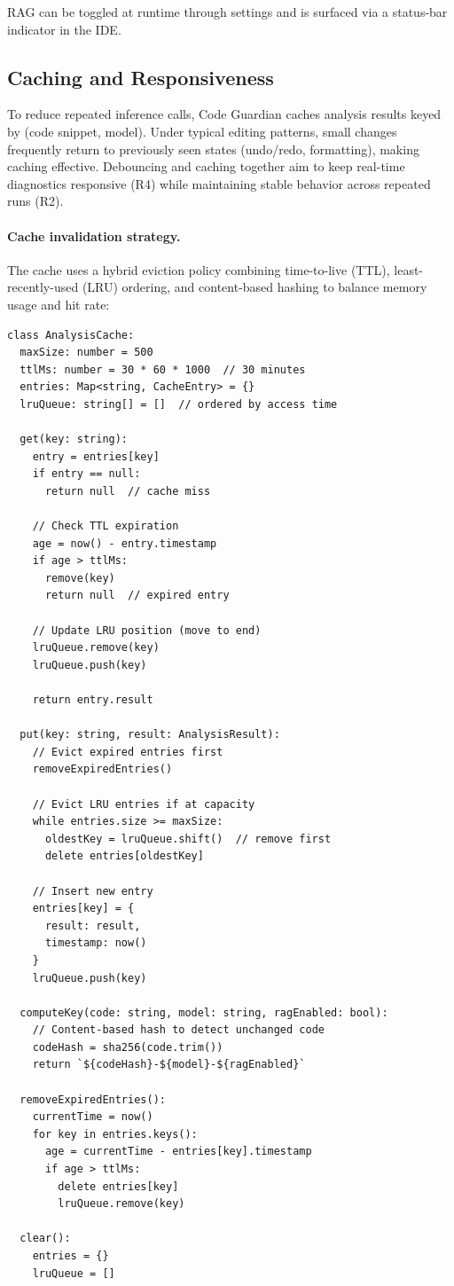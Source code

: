 RAG can be toggled at runtime through settings and is surfaced via a status-bar indicator in the IDE.

\subsection{Caching and Responsiveness}
\label{subsec:impl-caching}

To reduce repeated inference calls, Code Guardian caches analysis results keyed by (code snippet, model). Under typical editing patterns, small changes frequently return to previously seen states (undo/redo, formatting), making caching effective. Debouncing and caching together aim to keep real-time diagnostics responsive (R4) while maintaining stable behavior across repeated runs (R2).

\paragraph{Cache invalidation strategy.}
The cache uses a hybrid eviction policy combining time-to-live (TTL), least-recently-used (LRU) ordering, and content-based hashing to balance memory usage and hit rate:

\begin{lstlisting}[caption={Cache invalidation and eviction strategy}, label={lst:impl-cache-invalidation}]
class AnalysisCache:
  maxSize: number = 500
  ttlMs: number = 30 * 60 * 1000  // 30 minutes
  entries: Map<string, CacheEntry> = {}
  lruQueue: string[] = []  // ordered by access time

  get(key: string):
    entry = entries[key]
    if entry == null:
      return null  // cache miss

    // Check TTL expiration
    age = now() - entry.timestamp
    if age > ttlMs:
      remove(key)
      return null  // expired entry

    // Update LRU position (move to end)
    lruQueue.remove(key)
    lruQueue.push(key)

    return entry.result

  put(key: string, result: AnalysisResult):
    // Evict expired entries first
    removeExpiredEntries()

    // Evict LRU entries if at capacity
    while entries.size >= maxSize:
      oldestKey = lruQueue.shift()  // remove first
      delete entries[oldestKey]

    // Insert new entry
    entries[key] = {
      result: result,
      timestamp: now()
    }
    lruQueue.push(key)

  computeKey(code: string, model: string, ragEnabled: bool):
    // Content-based hash to detect unchanged code
    codeHash = sha256(code.trim())
    return `${codeHash}-${model}-${ragEnabled}`

  removeExpiredEntries():
    currentTime = now()
    for key in entries.keys():
      age = currentTime - entries[key].timestamp
      if age > ttlMs:
        delete entries[key]
        lruQueue.remove(key)

  clear():
    entries = {}
    lruQueue = []
\end{lstlisting}

